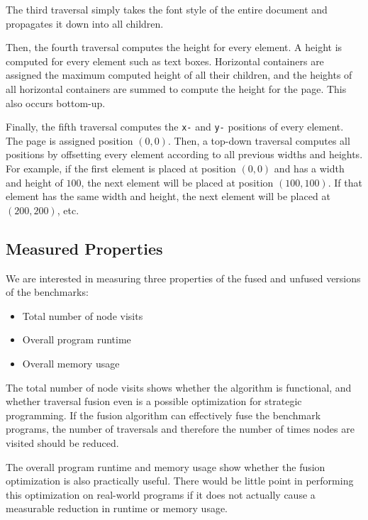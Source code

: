 The third traversal simply takes the font style of the entire document and propagates it down into all children.

Then, the fourth traversal computes the height for every element. A height is computed for every element such as text boxes. Horizontal containers are assigned the maximum computed height of all their children, and the heights of all horizontal containers are summed to compute the height for the page. This also occurs bottom-up.

Finally, the fifth traversal computes the \texttt{x-} and \texttt{y-} positions of every element. The page is assigned position $(0,0)$. Then, a top-down traversal computes all positions by offsetting every element according to all previous widths and heights. For example, if the first element is placed at position $(0,0)$ and has a width and height of $100$, the next element will be placed at position $(100,100)$. If that element has the same width and height, the next element will be placed at $(200,200)$, etc.

\subsection{Measured Properties}
We are interested in measuring three properties of the fused and unfused versions of the benchmarks:
\begin{itemize}
    \item Total number of node visits
    \item Overall program runtime
    \item Overall memory usage
\end{itemize}

The total number of node visits shows whether the algorithm is functional, and whether traversal fusion even is a possible optimization for strategic programming. If the fusion algorithm can effectively fuse the benchmark programs, the number of traversals and therefore the number of times nodes are visited should be reduced.

The overall program runtime and memory usage show whether the fusion optimization is also practically useful. There would be little point in performing this optimization on real-world programs if it does not actually cause a measurable reduction in runtime or memory usage.

